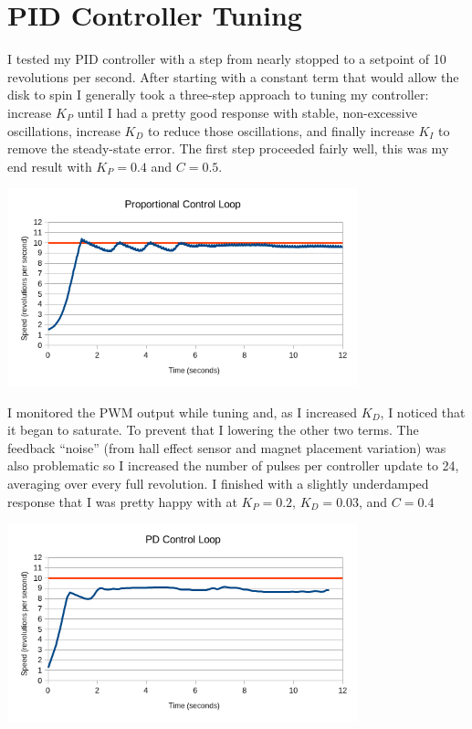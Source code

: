 \documentclass{article}
\begin{document}
\section*{PID Controller Tuning}
I tested my PID controller with a step from nearly stopped to a setpoint of 10 revolutions per second. After starting with a constant term that would allow the disk to spin I generally took a three-step approach to tuning my controller: increase $K_P$ until I had a pretty good response with stable, non-excessive oscillations, increase $K_D$ to reduce those oscillations, and finally increase $K_I$ to remove the steady-state error. The first step proceeded fairly well, this was my end result with $K_P = 0.4$ and $C = 0.5$.
\begin{center}
  \includegraphics[width=4in]{p_loop.png}
\end{center}
I monitored the PWM output while tuning and, as I increased $K_D$, I noticed that it began to saturate. To prevent that I lowering the other two terms. The feedback ``noise'' (from hall effect sensor and magnet placement variation) was also problematic so I increased the number of pulses per controller update to 24, averaging over every full revolution. I finished with a slightly underdamped response that I was pretty happy with at $K_P = 0.2$, $K_D = 0.03$, and $C = 0.4$
\begin{center}
  \includegraphics[width=4in]{pd_loop.png}
\end{center}
\end{document}
